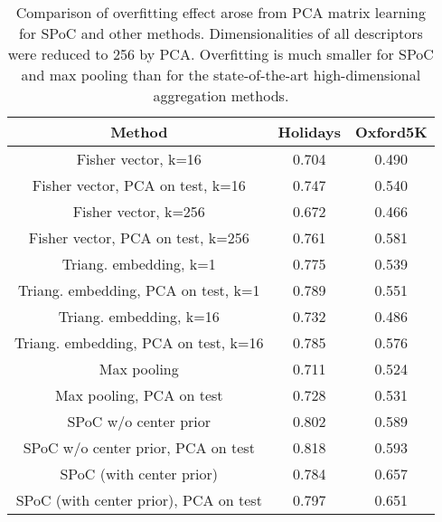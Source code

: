 \begin{table}
\setlength{\tabcolsep}{2pt}
\centering
\begin{tabular}{|c|c|c|}
\hline
Method & Holidays & Oxford5K\\
\hline
Fisher vector, k=16 & 0.704 & 0.490 \\
Fisher vector, PCA on test, k=16 & 0.747 & 0.540\\
\hline
Fisher vector, k=256 & 0.672 & 0.466 \\
Fisher vector, PCA on test, k=256 & 0.761 & 0.581\\
\hline
Triang. embedding, k=1 & 0.775 & 0.539\\
Triang. embedding, PCA on test, k=1 & 0.789 & 0.551\\
\hline
Triang. embedding, k=16 & 0.732 & 0.486\\
Triang. embedding, PCA on test, k=16 & 0.785 & 0.576\\
\hline
Max pooling & 0.711 & 0.524 \\
Max pooling, PCA on test & 0.728 & 0.531 \\
\hline
SPoC w/o center prior & 0.802 & 0.589 \\
SPoC w/o center prior, PCA on test & 0.818 & 0.593 \\
\hline
SPoC (with center prior) & 0.784 & 0.657 \\
SPoC (with center prior), PCA on test & 0.797 & 0.651 \\
\hline
\end{tabular}
\vspace{1mm}

\caption{Comparison of overfitting effect arose from PCA matrix learning for SPoC and other methods. Dimensionalities of all descriptors were reduced to 256 by PCA. Overfitting is much smaller for SPoC and max pooling than for the state-of-the-art high-dimensional aggregation methods.}
\label{tab:overfitting}
\vspace{-2mm}
\end{table}

